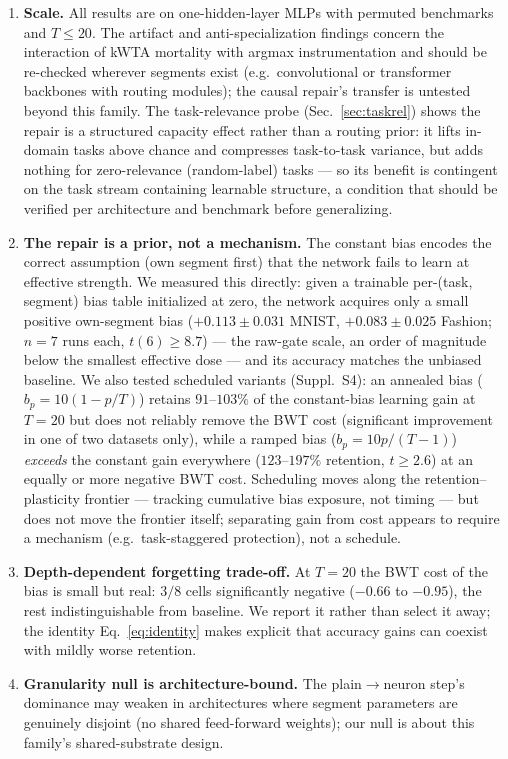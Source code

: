 \documentclass[review,12pt,number]{elsarticle}
\begin{document}
\begin{enumerate}
\item \textbf{Scale.} All results are on one-hidden-layer MLPs with
      permuted benchmarks and $T \le 20$. The artifact and
      anti-specialization findings concern the interaction of kWTA
      mortality with argmax instrumentation and should be re-checked
      wherever segments exist (e.g.\ convolutional or transformer backbones
      with routing modules); the causal repair's transfer is untested
      beyond this family. The task-relevance probe
      (Sec.~\ref{sec:taskrel}) shows the repair is a structured capacity
      effect rather than a routing prior: it lifts in-domain tasks above
      chance and compresses task-to-task variance, but adds nothing for
      zero-relevance (random-label) tasks --- so its benefit is
      contingent on the task stream containing learnable structure, a
      condition that should be verified per architecture and benchmark
      before generalizing.
\item \textbf{The repair is a prior, not a mechanism.} The constant bias
      encodes the correct assumption (own segment first) that the network
      fails to learn at effective strength. We measured this directly:
      given a trainable per-(task, segment) bias table initialized at
      zero, the network acquires only a small positive own-segment bias
      ($+0.113 \pm 0.031$ MNIST, $+0.083 \pm 0.025$ Fashion; $n{=}7$
      runs each, $t(6) \ge 8.7$) --- the raw-gate scale, an order of
      magnitude below the smallest effective dose --- and its accuracy
      matches the unbiased baseline. We also tested scheduled variants
      (Suppl.~S4): an annealed bias ($b_p = 10(1-p/T)$) retains
      $91$--$103\%$ of the constant-bias learning gain at $T{=}20$ but
      does not reliably remove the BWT cost (significant improvement in
      one of two datasets only), while a ramped bias ($b_p = 10p/(T{-}1)$)
      \emph{exceeds} the constant gain everywhere ($123$--$197\%$
      retention, $t \ge 2.6$) at an equally or more negative BWT cost.
      Scheduling moves along the retention--plasticity frontier ---
      tracking cumulative bias exposure, not timing --- but does not
      move the frontier itself; separating gain from cost appears to
      require a mechanism (e.g.\ task-staggered protection), not a
      schedule.
\item \textbf{Depth-dependent forgetting trade-off.} At $T{=}20$ the BWT
      cost of the bias is small but real: $3/8$ cells significantly
      negative ($-0.66$ to $-0.95$), the rest indistinguishable from
      baseline. We
      report it rather than select it away; the identity
      Eq.~\eqref{eq:identity} makes explicit that accuracy gains can
      coexist with mildly worse retention.
\item \textbf{Granularity null is architecture-bound.} The
      plain$\to$neuron step's dominance may weaken in architectures where
      segment parameters are genuinely disjoint (no shared feed-forward
      weights); our null is about this family's shared-substrate design.
\end{enumerate}
\end{document}
